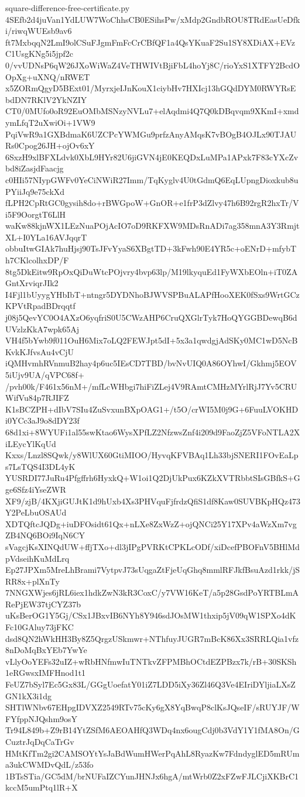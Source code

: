 \documentclass[11pt]{article}
\theoremstyle{definition}
\theoremstyle{remark}
\begin{document}
\begin{filecontents*}[overwrite]{square-difference-free-certificate.py}
4SEfb2d4juVan1YdLUW7WoChhsCB0ESihsPw/xMdp2GndbROU8TRdEasUeDfki/riwqWUEsb9av6
ft7MxbqqN2LmI9olCSuFJgmFmFcCrCBfQF1a4QsYKuaF2Su1SY8XDiAX+EVzC1UsgKNg5i5jpf2c
0/vvUDNsP6qW26JXoWiWaZ4VeTHWIVtBjiFbL4hoYj8C/rioYxS1XTFY2BcdOOpXg+uXNQ/nRWET
x5ZORmQgyD5BExt01/MyrxjeIJnKouX1ciybHv7HXIcj13hGQdDYM0RWYRsEbdDN7RKlV2YkNZIY
CT0/0MUfo0oR92EuOMbMSNzyNVLu7+elAqdmi4Q7Q0kDBqvqm9XKmI+xmdymLfqT2uXwiOi+1VW9
PqiVwR9a1GXBdmaK6UZCPcYWMGu9prfzAnyAMqsK7vBOgB4OJLx90TJAURs0Cpog26JH+ojOv6xY
6SxzH9xlBFXLdvk0XbL9HYr82U6jiGVN4jE0KEQDxLuMPa1APxk7F83cYXcZvbd8iZasjdFaacjg
c0HIi57NIypGWFv0YeCiNWiR27Imm/TqKyglv4U0tGdmQ6EqLUpngDioxkub8uPYiiJq9e75ckXd
fLPH2CpRtGC0gysih8do+rBWGpoW+GnOR+e1frP3dZlvy47h6B92rgR2hxTr/Vi5F9OorgtT6LlH
waKw88kjnWX1LEzNuaPOjAcIO7oD9RKFXW9MDsRnADi7ag358mnA3Y3RmjtXL+I0YLa16AVJqqrT
obbuItwGIAk7huHjsj90TsJFvYyaS6XBgtTD+3kFwh90E4YR5c+oENrD+mfybTh7CKlcolhxDP/F
8tg5DkEitw9RpOxQiDuWtcPOjvry4bvp63lp/M19lkyquEd1FyWXbEOln+iT0ZAGntXrviqrJIk2
I4Fjl1bUyygYHbIbT+ntngr5DYDNhoBJWVSPBuALAPfHooXEK0fSxs9WrtGCzKPVtRpadBDrqqtf
j08j5QevYC0O4AXzO6yqfriS0U5CWzAHP6CruQXGlrTyk7HoQYGGBDewqB6dUVzlzKkA7wpk65Aj
VH4f5bYwb9f011OuH6Mix7oLQ2FEWJpt5dI+5x3a1qwdgjAdSKy0MC1wD5NcBKvkKJfvsAu4vCjU
iQMHvmhRVnmuB2hay4p6uc5IEsCD7TBD/bvNvUIQ0A86OYhwI/Gkhmj5EOV5iUjv9UA/qVPC68f+
/pvh00k/F461x56nM+/mfLcWHbgi7hiFiZLej4V9RAmtCMHzMYrlRjJ7Yv5CRUWifVu84p7RJIFZ
K1sBCZPH+dIbV7SIu4ZuSvxunBXpOAG1+/t5O/crWI5M0j9G+6FuuLVOKHDi0YCc3aJ9o8dDY23f
68d1xi+8WYUFi1al55swKtao6WysXPfLZ2NfzwsZnf4i209d9FaoZjZ5VFoNTLA2XiLEycYlKqUd
Kxxs/Lnzl8SQwk/y8WlUX60GtiMIOO/HyvqKFVBAq1Lh33bjSNERI1FOvEaLps7LsTQS4I3DL4yK
YUSRDI77JuRu4Pfgffrh6HyxkQ+W1oi1Q2DjUkPux6KZkXVTRbbtSIsGBfkS+Gge6Sfz4iYseZWR
XF9/zjB/4KXjiGUJtK1d9hUxb4Xs3PHVquFjfrdzQfiS1df8Kaw0SUVBKpHQz473Y2PeLbuOSAUd
XDTQftcJQDg+iuDFOsidt61Qx+nLXe8ZxWzZ+ojQNCi25Y17XPv4aWzXm7vgZB4NQ6BOi9IqN6CY
sVagcjKsXINQdUW+ffjTXo+dl3jIPgPVRKtCPKLcODf/xiDcefPBOFnV5BHlMdpVdseihKuMdLrq
Ep27JPXm5MreLhBrami7VytpvJ73sUqgaZtFjeUqGhq8mmlRFJkfBsuAzd1rkk/jSRR8x+plXnTy
7NNGXWjes6jRL6iex1hdkZwN3kR3CoxC/y7VW16KeT/a5p28GsdPoYRTBLmARePjEW37tjCYZ37b
uKsBerOG1Y5Gj/CSx1JBxvIB6NYh8Y946sdJOsMW1thxip5jV09qW1SPXo4dKFc10GAluy73jFKC
dsd8QN2hWkHH3By8Z5QrgzUSkmwr+NThfuyJUGR7mBcK86Xx3SRRLQia1vfz8nDoMqBxYEb7YwYe
vLlyOoYEFs32uIZ+wRbHNfmwIuTNTkvZFPMBhOCtdEZPBzx7k/rB+30SKSh1eRGwsxIMFHnod1t1
FeUZ7bSyl7Ec5Gx83L/GGgUoefatY01iZ7LDD5iXy36Zl46Q3Ve4EIriDYljiaLXsZGN1kX3i1dg
SHTlWNbv67EHpgIDVXZ2549RTv75cKy6gX8YqBwqP8clKsJQseIF/sRUYJF/WFYfppNJQshm9osY
Tr94L849b+Z9rB14YtZSfM6AEOAHfQ3WDq4nx6ougCdj0b3VdY1Y1fMA8On/GCuztrJqDqCaTrGv
HMtKfTm2gi2CAMSOYtYsJaBdWumHWerPqAhL8RyazKw7FdndyglED5mRUma3ukCWMDvQdL/z53fo
1BTsSTia/GC5dM/brNUFaIZCYunJHNJx6hgA/mtWrb0Z2xFZwFJLCjiXKBrC1kccM5umPtq1lR+X

\end{filecontents*}
\end{document}
